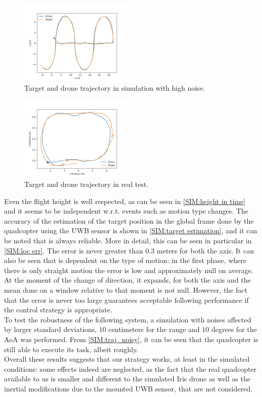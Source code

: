 \begin{figure}
    \centering
    \includegraphics[width=0.48\textwidth]{images/Simulation/Drone_Target x-y Position_noisy.png}
    \caption{Target and drone trajectory in simulation with high noise.}
    \label{SIM:traj_noisy}
\end{figure}

\begin{figure}
    \centering
    \includegraphics[width=0.48\textwidth]{images/real_test/drone_target_xy_pos.png}
    \caption{Target and drone trajectory in real test.}
    \label{REAL:fig:traj}
\end{figure}

Even the flight height is well respected, as can be seen in \autoref{SIM:height in time} and it seems to be independent w.r.t. events such as motion type changes. 
The accuracy of the estimation of the target position in the global frame done by the quadcopter using the UWB sensor is shown in \autoref{SIM:target estimation}, and it can be noted that is always reliable. More in detail, this can be seen in particular in \autoref{SIM:loc err}. The error is never greater than $0.3$ meters for both the axis. It can also be seen that is dependent on the type of motion: in the first phase, where there is only straight motion the error is low and approximately null on average. At the moment of the change of direction, it expands, for both the axis and the mean done on a window relative to that moment is not null. However, the fact that the error is never too large guarantees acceptable following performance if the control strategy is appropriate. \\
To test the robustness of the following system, a simulation with noises affected by larger standard deviations, $10$ centimeters for the range and $10$ degrees for the AoA was performed. From \autoref{SIM:traj_noisy}, it can be seen that the quadcopter is still able to execute its task, albeit roughly. \\
Overall these results suggests that our strategy works, at least in the simulated conditions: some effects indeed are neglected, as the fact that the real quadcopter available to us is smaller and different to the simulated Iris drone as well as the inertial modifications due to the mounted UWB sensor, that are not considered. 

